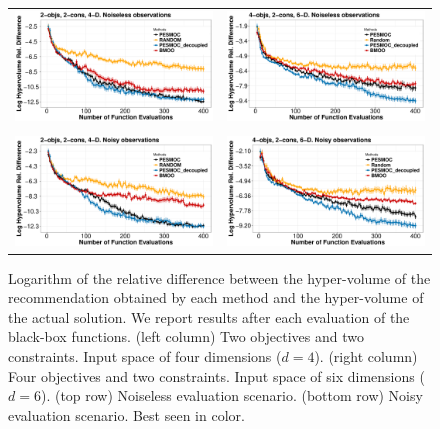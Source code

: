 \documentclass[review,preprint,12pt]{elsarticle}
\begin{document}
\begin{figure}[htb]
\begin{tabular}{cc}
	\vspace{-.2cm}
	\includegraphics[width=0.475\linewidth]{figures/synthetic/4d_noiseless_NEW.pdf} &
	\includegraphics[width=0.475\linewidth]{figures/synthetic/6d_noiseless_NEW.pdf} \\\\
	\includegraphics[width=0.475\linewidth]{figures/synthetic/4d_noisy_NEW.pdf} &
        \includegraphics[width=0.475\linewidth]{figures/synthetic/6d_noisy_NEW.pdf}
	\vspace{-.1cm}
\end{tabular}
\caption{{\small Logarithm of the relative difference between the hyper-volume of 
the recommendation obtained by each method and the hyper-volume of the actual solution. 
We report results after each evaluation of the black-box functions. (left column) Two objectives and two constraints. 
Input space of four dimensions ($d=4$). (right column) 
Four objectives and two constraints.  Input space of six dimensions ($d=6$). (top row) 
Noiseless evaluation scenario. (bottom row) Noisy evaluation scenario. Best seen in color.}}
	\label{fig:results_synthetic}
	\vspace{-.25cm}
\end{figure}
\end{document}
